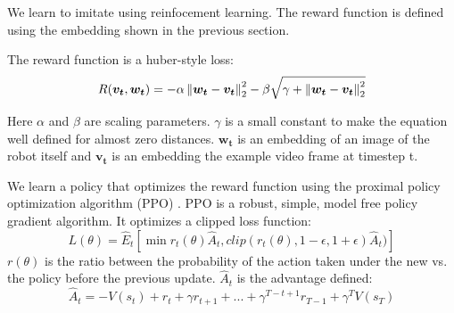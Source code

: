 We learn to imitate using reinfocement learning. The reward function is defined using the embedding shown in the previous section.

The reward function is a huber-style loss: \[
    R(\boldsymbol{v_t}, \boldsymbol{w_t}) = -\alpha \left\lVert\boldsymbol{w_t} - \boldsymbol{v_t}\right\rVert^2_2 -\beta \sqrt{\gamma + \left\lVert\boldsymbol{w_t} - \boldsymbol{v_t}\right\rVert^2_2}
\]

Here $\alpha$ and $\beta$ are scaling parameters. $\gamma$ is a small constant to make the equation well defined for almost zero distances. $\boldsymbol{w_t}$ is an embedding of an image of the robot itself and $\boldsymbol{v_t}$ is an embedding the example video frame at timestep t.

We learn a policy that optimizes the reward function using the proximal policy optimization algorithm (PPO) \citep{ppo}. PPO is a robust, simple, model free policy gradient algorithm. It optimizes a clipped loss function: \[
    L(\theta) = \hat{E}_t[\min{r_t(\theta)\hat{A}_t, clip(r_t(\theta), 1 - \epsilon, 1 + \epsilon)\hat{A}_t})]
\]
$r(\theta)$ is the ratio between the probability of the action taken under the new vs. the policy before the previous update. $\hat{A}_t$ is the advantage defined: \[
    \hat{A}_t = -V(s_t) + r_t + \gamma r_{t+1} + ... + \gamma^{T-t+1}r_{T-1} + \gamma^T V(s_T)
    \]


